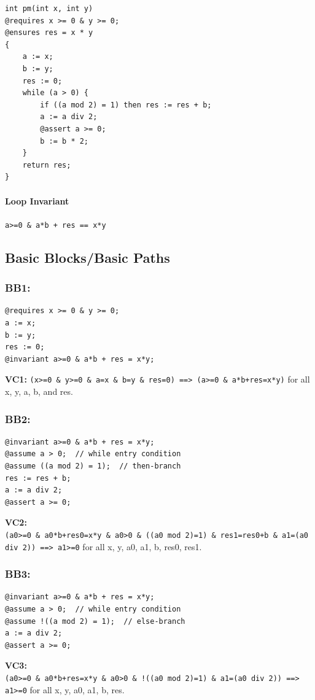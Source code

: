 \documentclass{article}
\begin{document}
\begin{verbatim}
int pm(int x, int y)
@requires x >= 0 & y >= 0;
@ensures res = x * y
{
    a := x;
    b := y;
    res := 0;
    while (a > 0) {
        if ((a mod 2) = 1) then res := res + b;
        a := a div 2;
        @assert a >= 0;
        b := b * 2;
    }
    return res;
}
\end{verbatim}

\paragraph{Loop Invariant} \verb|a>=0 & a*b + res == x*y|

\subsection*{Basic Blocks/Basic Paths}
\subsubsection*{BB1:}
\begin{verbatim}
@requires x >= 0 & y >= 0;
a := x;
b := y;
res := 0;
@invariant a>=0 & a*b + res = x*y;
\end{verbatim}
\textbf{VC1:}
\verb|(x>=0 & y>=0 & a=x & b=y & res=0) ==> (a>=0 & a*b+res=x*y)| for all x, y, a, b, and res.

\subsubsection*{BB2:}
\begin{verbatim}
@invariant a>=0 & a*b + res = x*y;
@assume a > 0;  // while entry condition
@assume ((a mod 2) = 1);  // then-branch
res := res + b;
a := a div 2;
@assert a >= 0;
\end{verbatim}
\textbf{VC2:}\\
\verb|(a0>=0 & a0*b+res0=x*y & a0>0 & ((a0 mod 2)=1) & res1=res0+b & a1=(a0 div 2)) ==> a1>=0| for all x, y, a0, a1, b, res0, res1.

\subsubsection*{BB3:}
\begin{verbatim}
@invariant a>=0 & a*b + res = x*y;
@assume a > 0;  // while entry condition
@assume !((a mod 2) = 1);  // else-branch
a := a div 2;
@assert a >= 0;
\end{verbatim}
\textbf{VC3:}\\
\verb|(a0>=0 & a0*b+res=x*y & a0>0 & !((a0 mod 2)=1) & a1=(a0 div 2)) ==> a1>=0| for all x, y, a0, a1, b, res.
\end{document}
